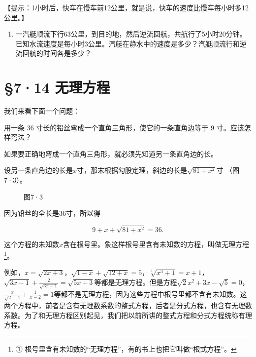 【提示：1小时后，快车在慢车前12公里，就是说，快车的速度比慢车每小时多12公里。】

\begin{enumerate}[start=4]
\item
  一汽艇顺流下行63公里，到目的地，然后逆流回航，共航行了5小时20分钟。已知水流速度是每小时3公里。汽艇在静水中的速度是多少？汽艇顺流行和逆流回航的时间各是多少？
\end{enumerate}

\section{§7·14 无理方程}

我们来看下面一个问题：

用一条 36 寸长的铅丝弯成一个直角三角形，使它的一条直角边等于 9
寸。应该怎样弯法？

如果要正确地弯成一个直角三角形，就必须先知道另一条直角边的长。

设另一条直角边的长是\(x\)寸，那末根据勾股定理，斜边的长是\(\sqrt{81 + x^2}\)寸
（图7·3）。

\begin{figure}
\centering
{}
\caption{图7·3}
\end{figure}

因为铅丝的全长是36寸，所以得

\[
9 + x + \sqrt {81 + x ^ {2}} = 36.
\]

这个方程的未知数\(x\)含在根号里。象这样根号里含有未知数的方程，叫做无理方程\footnote{①
  根号里含有未知数的``无理方程''，有的书上也把它叫做``根式方程''。}。

例如，\(x=\sqrt{2x+3}\)，\(\sqrt{1-x}+\sqrt{12+x}=5\)，\(\sqrt[3]{x^{3}+1}=x+1\)，\(\sqrt{3x-1}+\frac{2}{\sqrt{3x-1}}=\sqrt{5x+3}\)等都是无理方程。但是方程\(\sqrt{2}x^{2}+3x-\sqrt{5}=0\)，\(\frac{x}{\sqrt{2}-1}+\frac{1}{x-2}=1\)等都不是无理方程，因为这些方程中根号里都不含有未知数。这两个方程中，前者是含有无理数系数的整式方程，后者是分式方程，也含有无理数系数。为了和无理方程区别起见，我们把以前所讲的整式方程和分式方程统称有理方程。


